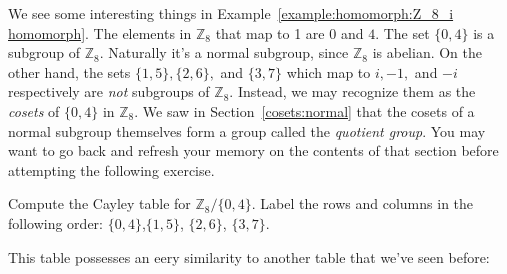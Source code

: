 We see some interesting things in  Example~\ref{example:homomorph:Z_8_i homomorph}. 
The elements in ${\mathbb Z}_8$ that map to 1 are  $0$ and $4$. The set $\{0,4\}$ is a subgroup of ${\mathbb Z}_8$.  Naturally it's a normal subgroup, since $\mathbb{Z}_8$ is abelian.
On the other hand, the sets $\{1,5\}, \{2,6\},$ and $\{3,7\}$ which map to $i, -1,$ and $-i$ respectively are \emph{not} subgroups of ${\mathbb Z}_8$. Instead, we may recognize them as the \emph{cosets} of $\{0,4\}$ in ${\mathbb Z}_8$. We saw in Section~\ref{cosets:normal} 
that the cosets of a normal subgroup themselves form a group called the \emph{quotient group}. You may want
to go back and refresh your memory on the contents of that section before attempting the following exercise. 

%

\begin{exercise}\label{exercise:homomorph:verify_Z8/04}
Compute the Cayley table for ${\mathbb Z}_8/ \{0,4\}$. Label the rows and columns in the following order:
$\{0,4\}$,$\{1,5\}$, $\{2,6\}$,  $\{3,7\}$. 
\end{exercise}

This table possesses an eery similarity to another table that we've seen before:
%
%


